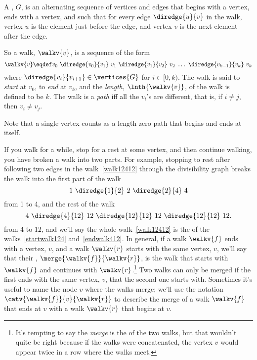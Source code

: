 \begin{definition}\label{def:digraph-walks}
A , $G$, is an alternating sequence of
vertices and edges that begins with a vertex, ends with a vertex, and
such that for every edge $\diredge{u}{v}$ in the walk, vertex $u$ is
the element just before the edge, and vertex $v$ is the next element
after the edge.

So a walk, $\walkv{v}$, is a sequence of the form
\[
\walkv{v} \eqdef v_0\ \diredge{v_0}{v_1}\
v_1\  \diredge{v_1}{v_2}\  v_2\  \dots\  \diredge{v_{k-1}}{v_k}\  v_k
\]
where $\diredge{v_i}{v_{i+1}} \in \vertices{G}$ for $i \in [0,k)$.
  The walk is said to \emph{start} at $v_0$, to \emph{end} at $v_k$,
  and the \emph{length}, $\lnth{\walkv{v}}$, of the walk is defined to be
  $k$.  The walk is a \emph{path} iff all the $v_i$'s are different,
  that is, if $i \neq j$, then $v_i \neq v_j$.
\end{definition}
Note that a single vertex counts as a length zero path that begins and
ends at itself.

If you walk for a while, stop for a rest at some vertex, and then
continue walking, you have broken a walk into two parts.  For example,
stopping to rest after following two edges in the walk~\eqref{walk12412}
through the divisibility graph breaks the walk into the first part of the walk
\begin{equation}\label{startwalk124}
1\ \diredge{1}{2}\  2\  \diredge{2}{4}\  4
\end{equation}
from 1 to 4, and the rest of the walk
\begin{equation}\label{endwalk412}
4\ \diredge{4}{12}\  12\  \diredge{12}{12}\  12\ \diredge{12}{12}\  12.
\end{equation}
from 4 to 12, and we'll say the whole walk~\eqref{walk12412} is the
\term{merge} of the walks~\eqref{startwalk124} and~\eqref{endwalk412}.
In general, if a walk $\walkv{f}$ ends with a vertex, $v$, and a walk
$\walkv{r}$ starts with the same vertex, $v$, we'll say that their
\term{merge}, $\merge{\walkv{f}}{\walkv{r}}$, is the walk that starts
with $\walkv{f}$ and continues with $\walkv{r}$.\footnote{It's
  tempting to say the \emph{merge} is the  of the
  two walks, but that wouldn't quite be right because if the walks
  were concatenated, the vertex $v$ would appear twice in a row where
  the walks meet.}  Two walks can only be merged if the first ends
with the same vertex, $v$, that the second one starts with.  Sometimes
it's useful to name the node $v$ where the walks merge; we'll use the
notation $\catv{\walkv{f}}{v}{\walkv{r}}$ to describe the merge of a
walk $\walkv{f}$ that ends at $v$ with a walk $\walkv{r}$ that begins
at $v$.

